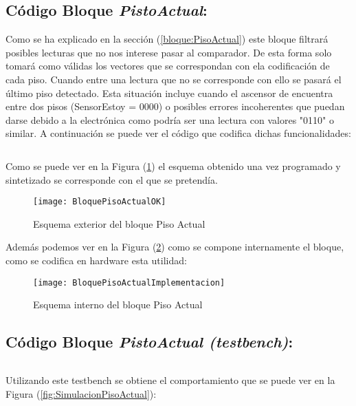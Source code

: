 \subsection{Código Bloque \textit{PistoActual}:} \label{code:PisoActual}
	Como se ha explicado en la sección (\ref{bloque:PisoActual}) este bloque filtrará posibles lecturas que no nos interese pasar al comparador. De esta forma solo tomará como válidas los vectores que se correspondan con ela codificación de cada piso. Cuando entre una lectura que no se corresponde con ello se pasará el último piso detectado. Esta situación incluye cuando el ascensor de encuentra entre dos pisos (SensorEstoy = 0000) o posibles errores incoherentes que puedan darse debido a la electrónica como podría ser una lectura con valores "0110" o similar. A continuación se puede ver el código que codifica dichas funcionalidades: \\ 

    \inputminted[frame=lines,fontsize=\footnotesize,linenos]{vhdl}{CodeFiles/PisoActual.vhd}
    
    Como se puede ver en la Figura (\ref{fig:BloquePisoActualOK}) el esquema obtenido una vez programado y sintetizado se corresponde con el que se pretendía.
    \begin{figure}[H]
		    \centering
		    \texttt{[image: BloquePisoActualOK]}
		    \caption{Esquema exterior del bloque Piso Actual}
		    \label{fig:BloquePisoActualOK}
	\end{figure}
    Además podemos ver en la Figura (\ref{fig:BloquePisoActualImplementacion}) como se compone internamente el bloque, como se codifica en hardware esta utilidad:
    \begin{figure}[H]
		    \centering
		    \texttt{[image: BloquePisoActualImplementacion]}
		    \caption{Esquema interno del bloque Piso Actual}
		    \label{fig:BloquePisoActualImplementacion}
	\end{figure}

\subsection{Código Bloque \textit{PistoActual (testbench)}:} \label{code:PisoActual_tb}
    \inputminted[frame=lines,fontsize=\footnotesize,linenos]{vhdl}{CodeFiles/PisoActual_tb.vhd}
    
    Utilizando este testbench se obtiene el comportamiento que se puede ver en la Figura (\ref{fig:SimulacionPisoActual}):

